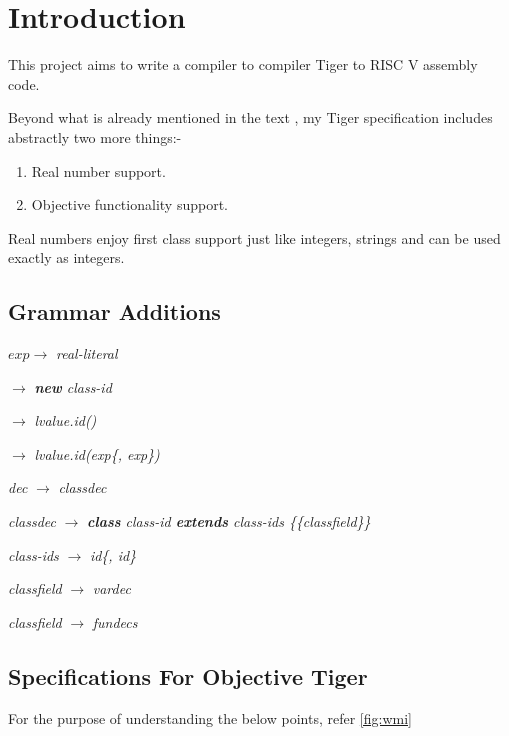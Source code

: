 \chapter{Introduction}
\hspace{3mm}

This project aims to write a compiler to compiler Tiger to RISC V assembly code.


Beyond what is already mentioned in the text \cite{tigerbook}, my Tiger specification includes abstractly two more things:-

\begin{enumerate}
  \item Real number support.
  \item Objective functionality support.
\end{enumerate}

Real numbers enjoy first class support just like integers, strings and can be used exactly as integers.

\section{Grammar Additions}

$exp \rightarrow$ \textit{real-literal}

$\rightarrow$ \textit{\textbf{new} class-id}

$\rightarrow$ \textit{lvalue.id()}

$\rightarrow$ \textit{lvalue.id(exp\{, exp\})}

\textit{dec} $\rightarrow$ \textit{classdec}

\textit{classdec} $\rightarrow$ \textit{\textbf{class} class-id \textbf{extends} class-ids \{\{classfield\}\}}

\textit{class-ids} $\rightarrow$ \textit{id\{, id\}}

\textit{classfield} $\rightarrow$ \textit{vardec}

\textit{classfield} $\rightarrow$ \textit{fundecs}

\section{Specifications For Objective Tiger}

For the purpose of understanding the below points, refer \ref{fig:wmi}

